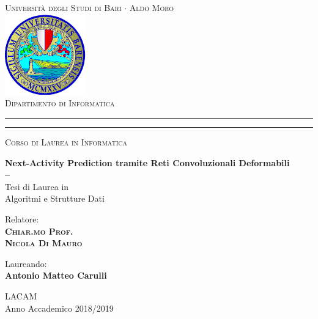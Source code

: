\documentclass[12pt,a4paper]{report}
\begin{document}
    \begin{titlepage}
        \begin{center}
            {{\Large{\textsc{Universit\`a degli Studi di Bari $\cdot$ Aldo Moro
            }}}} \\
            \vspace{5mm}
            \includegraphics[width=35mm]{logouniba}\\
            \vspace{5mm}
            \Large{\textsc{Dipartimento di Informatica}} \rule[0.1cm]{15.8cm}{0.1mm}
            \rule[0.5cm]{15.8cm}{0.6mm}
            {\small{\textsc {
            \vspace{5mm}
            Corso di Laurea in Informatica}}}
        \end{center}
        \vspace{15mm}
        \begin{center}
            {\LARGE\textbf{Next-Activity Prediction tramite \break Reti Convoluzionali Deformabili}}\\
            {\LARGE{\bf --}}\\
            \vspace{15mm} {\large{\sc Tesi di Laurea in 
            \\ Algoritmi e Strutture Dati}}
        \end{center}
        \vfill
        \par
        \noindent
        \begin{minipage}[t]{0.47\textwidth}
            \vspace{10mm} {\large{\sc Relatore:}\\
            {\bf \textsc{Chiar.mo Prof.\\
             Nicola Di Mauro}}}
        \end{minipage}
        \hfill
        \begin{minipage}[t]{0.47\textwidth}\raggedleft
            \vspace{10mm} {\large{\sc Laureando:}\\
            {\bf Antonio Matteo Carulli}}
        \end{minipage}
        \begin{center}
            {\vspace{5mm} \large{\sc LACAM \\
            \vspace{10mm} Anno Accademico 2018/2019}}%
        \end{center}
    \end{titlepage}
\end{document}
